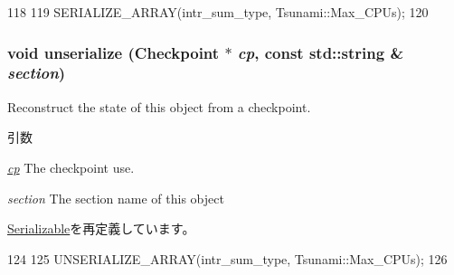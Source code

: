 \begin{DoxyCode}
118 {
119     SERIALIZE_ARRAY(intr_sum_type, Tsunami::Max_CPUs);
120 }
\end{DoxyCode}
\hypertarget{classTsunami_af22e5d6d660b97db37003ac61ac4ee49}{
\subsubsection[{unserialize}]{\setlength{\rightskip}{0pt plus 5cm}void unserialize ({\bf Checkpoint} $\ast$ {\em cp}, \/  const std::string \& {\em section})}}
\label{classTsunami_af22e5d6d660b97db37003ac61ac4ee49}
Reconstruct the state of this object from a checkpoint. 
\begin{DoxyParams}{引数}
\item[{\em \hyperlink{namespacecp}{cp}}]The checkpoint use. \item[{\em section}]The section name of this object \end{DoxyParams}


\hyperlink{classSerializable_af100c4e9feabf3cd918619c88c718387}{Serializable}を再定義しています。


\begin{DoxyCode}
124 {
125     UNSERIALIZE_ARRAY(intr_sum_type, Tsunami::Max_CPUs);
126 }
\end{DoxyCode}


